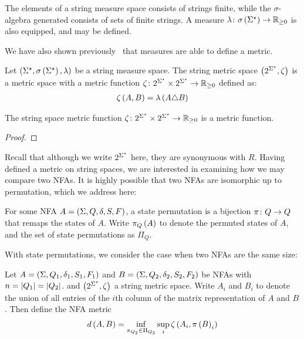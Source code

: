 \documentclass[12pt]{article}
\begin{document}
The elements of a string measure space consists of strings finite,
while the \(\sigma\)-algebra generated consists of sets of finite strings.
A measure \(\lambda \colon \sigma\left(\Sigma^\star\right) \to \mathbb{R}_{\geq 0}\) is also
equipped, and may be defined.

We have also shown previously~\cite{xue2018langmeasures} that
measures are able to define a metric.

\begin{definition}
  Let
  \(\left(\Sigma^\star, \sigma\left(\Sigma^\star\right), \lambda\right)\)
  be a string measure space.
  The string metric space \(\left(2^{\Sigma^\star}, \zeta\right)\) is
  a metric space with a metric function
  \(\zeta \colon 2^{\Sigma^\star} \times 2^{\Sigma^\star} \to \mathbb{R}_{\geq 0}\)
  defined as:
  \begin{align*}
    \zeta \left(A, B\right)
      = \lambda\left(A \triangle B\right)
  \end{align*}
\end{definition}
\begin{theorem}
  The string space metric function
  \(\zeta \colon 2^{\Sigma^\star} \times 2^{\Sigma^\star} \to \mathbb{R}_{\geq 0}\)
  is a metric function.
\end{theorem}
\begin{proof}
\end{proof}

Recall that although we write \(2^{\Sigma^\star}\) here,
they are synonymous with \(R\).
Having defined a metric on string spaces,
we are interested in examining how we may compare two NFAs.
It is highly possible that two NFAs are isomorphic up to permutation,
which we address here:
\begin{definition}
  For some NFA \(A = \left(\Sigma, Q, \delta, S, F\right)\),
  a state permutation is a bijection \(\pi \colon Q \to Q\)
  that remaps the states of \(A\).
  Write \(\pi_{Q}\left(A\right)\) to denote the permuted states of \(A\),
  and the set of state permutations as \(\Pi_Q\).
\end{definition}

With state permutations,
we consider the case when two NFAs are the same size:
\begin{definition}
  Let \(A = \left(\Sigma, Q_1, \delta_1, S_1, F_1\right)\)
  and \(B = \left(\Sigma, Q_2, \delta_2, S_2, F_2\right)\)
  be NFAs with \(n = \left\lvert Q_1\right\rvert = \left\lvert Q_2\right\rvert\).
  and \(\left(2^{\Sigma^\star}, \zeta\right)\) a string metric space.
  Write \(A_i\) and \(B_i\) to denote the union of all entries
  of the \(i\)th column of the matrix representation of \(A\) and \(B\).
  Then define the NFA metric
  \begin{align*}
    d \left(A, B\right)
      = \inf_{\pi_{Q_2} \in \Pi_{Q_2}} \sup_{i}
          \zeta\left(A_{i}, \pi\left(B\right)_{i}\right)
  \end{align*}
\end{definition}





\printbibliography
\end{document}
